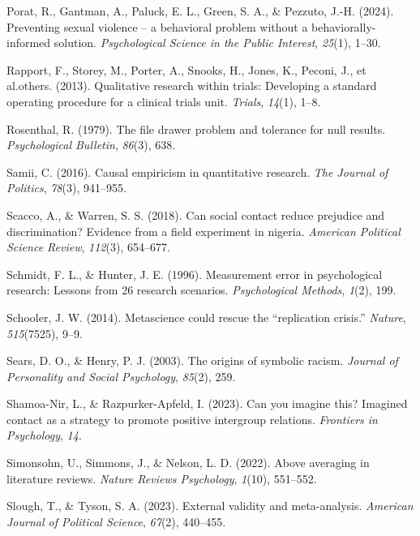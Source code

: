\documentclass[
  man]{apa6}
\newlength{\cslhangindent}
\newenvironment{CSLReferences}[2] %
 {\begin{list}{}{%
  \setlength{\itemindent}{0pt}
  \setlength{\leftmargin}{0pt}
  \setlength{\parsep}{0pt}
  \ifodd #1
   \setlength{\leftmargin}{\cslhangindent}
   \setlength{\itemindent}{-1\cslhangindent}
  \fi
  \setlength{\itemsep}{#2\baselineskip}}}
 {\end{list}}
\begin{document}
\begin{CSLReferences}{1}{0}
Porat, R., Gantman, A., Paluck, E. L., Green, S. A., \& Pezzuto, J.-H. (2024). Preventing sexual violence -- a behavioral problem without a behaviorally-informed solution. \emph{Psychological Science in the Public Interest}, \emph{25}(1), 1--30.

Rapport, F., Storey, M., Porter, A., Snooks, H., Jones, K., Peconi, J., et al.others. (2013). Qualitative research within trials: Developing a standard operating procedure for a clinical trials unit. \emph{Trials}, \emph{14}(1), 1--8.

Rosenthal, R. (1979). The file drawer problem and tolerance for null results. \emph{Psychological Bulletin}, \emph{86}(3), 638.

Samii, C. (2016). Causal empiricism in quantitative research. \emph{The Journal of Politics}, \emph{78}(3), 941--955.

Scacco, A., \& Warren, S. S. (2018). Can social contact reduce prejudice and discrimination? Evidence from a field experiment in nigeria. \emph{American Political Science Review}, \emph{112}(3), 654--677.

Schmidt, F. L., \& Hunter, J. E. (1996). Measurement error in psychological research: Lessons from 26 research scenarios. \emph{Psychological Methods}, \emph{1}(2), 199.

Schooler, J. W. (2014). Metascience could rescue the {``replication crisis.''} \emph{Nature}, \emph{515}(7525), 9--9.

Sears, D. O., \& Henry, P. J. (2003). The origins of symbolic racism. \emph{Journal of Personality and Social Psychology}, \emph{85}(2), 259.

Shamoa-Nir, L., \& Razpurker-Apfeld, I. (2023). Can you imagine this? Imagined contact as a strategy to promote positive intergroup relations. \emph{Frontiers in Psychology}, \emph{14}.

Simonsohn, U., Simmons, J., \& Nelson, L. D. (2022). Above averaging in literature reviews. \emph{Nature Reviews Psychology}, \emph{1}(10), 551--552.

Slough, T., \& Tyson, S. A. (2023). External validity and meta-analysis. \emph{American Journal of Political Science}, \emph{67}(2), 440--455.


\end{CSLReferences}
\end{document}
